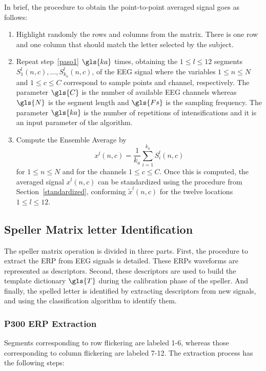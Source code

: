 \begin{itemize}
In brief, the procedure to obtain the point-to-point averaged signal goes as follows:

\begin{enumerate}
\item \label{paso1}Highlight randomly the rows and columns from the matrix.  There is one row and one column that should match the letter selected by the subject.
\item  \label{paso2} Repeat step~\ref{paso1} $\gls{ka}$ times, obtaining the $1 \leq l \leq 12$ segments $S_1^l(n,c),\dots,S_{k_a}^l(n,c)$, of the EEG signal where the variables $1 \leq n \leq N$ and $1 \leq c \leq C$  correspond to sample points and channel, respectively. The parameter $\gls{C}$ is the number of available EEG channels whereas $\gls{N}$ is the segment length and $\gls{Fs}$ is the sampling frequency.  The parameter $\gls{ka}$ is the number of repetitions of intensifications and it is an input parameter of the algorithm.
\item \label{paso3} Compute the Ensemble Average by
\begin{equation}
x^l(n,c)= \frac{1}{k_a}\sum_{i=1}^{k_a}S_i^l(n,c) 
\label{averaging}
\end{equation}  
for $1 \leq n \leq N$ and for the channels $1 \leq c \leq C$. Once this is computed,  the averaged signal $x^l(n,c)$ can be standardized using the procedure from Section~\ref{standardized}, conforming $\tilde{x}^l(n,c)$ for the twelve locations $ 1 \leq l \leq 12$.
\end{enumerate}
\end{itemize}


\subsection{Speller Matrix letter Identification}
\label{Classification}

The speller matrix operation is divided in three parts.  First, the procedure to extract the ERP from EEG signals is detailed.  These ERPs waveforms are represented as descriptors.  Second, these descriptors are used to build the template dictionary $\gls{T}$ during the calibration phase of the speller.  And finally, the spelled letter is identified by extracting descriptors from new signals, and using the classification algorithm to identify them.

\subsubsection{P300 ERP Extraction}
Segments corresponding to row flickering are labeled 1-6, whereas those corresponding to column flickering are labeled 7-12.  The extraction process has the following steps:

